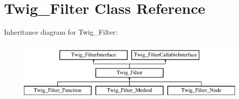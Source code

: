 \hypertarget{class_twig___filter}{}\section{Twig\+\_\+\+Filter Class Reference}
\label{class_twig___filter}
Inheritance diagram for Twig\+\_\+\+Filter\+:\begin{figure}[H]
\begin{center}
\leavevmode
\includegraphics[height=3.000000cm]{class_twig___filter}
\end{center}
\end{figure}
